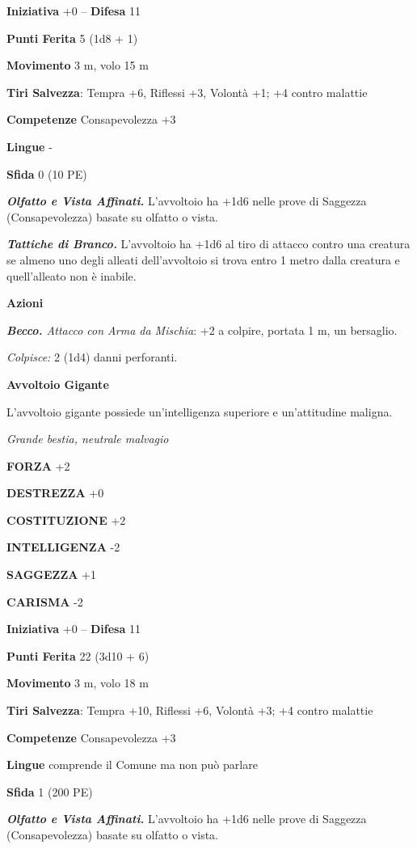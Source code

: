 \begin{multicols}{2}
\textbf{Iniziativa} +0 -- \textbf{Difesa} 11

\textbf{Punti Ferita} 5 (1d8 + 1)

\textbf{Movimento} 3 m, volo 15 m

\textbf{Tiri Salvezza}: Tempra +6, Riflessi +3, Volontà +1; +4 contro malattie

\textbf{Competenze} Consapevolezza +3

\textbf{Lingue} -

\textbf{Sfida} 0 (10 PE)

\emph{\textbf{Olfatto e Vista Affinati.}} L'avvoltoio ha +1d6 nelle prove di Saggezza (Consapevolezza) basate su olfatto o vista.

\emph{\textbf{Tattiche di Branco.}} L'avvoltoio ha +1d6 al tiro di attacco contro una creatura se almeno uno degli alleati dell'avvoltoio si trova entro 1 metro dalla creatura e quell'alleato non è inabile.

\textbf{Azioni}

\emph{\textbf{Becco.} Attacco con Arma da Mischia}: +2 a colpire, portata 1 m, un bersaglio.

\emph{Colpisce:} 2 (1d4) danni perforanti.

\medskip\textbf{Avvoltoio Gigante}

L'avvoltoio gigante possiede un'intelligenza superiore e un'attitudine maligna.

\emph{Grande bestia, neutrale malvagio}

\textbf{FORZA} +2

\textbf{DESTREZZA} +0

\textbf{COSTITUZIONE} +2

\textbf{INTELLIGENZA} -2

\textbf{SAGGEZZA} +1

\textbf{CARISMA} -2

\textbf{Iniziativa} +0 -- \textbf{Difesa} 11

\textbf{Punti Ferita} 22 (3d10 + 6)

\textbf{Movimento} 3 m, volo 18 m

\textbf{Tiri Salvezza}: Tempra +10, Riflessi +6, Volontà +3; +4 contro malattie

\textbf{Competenze} Consapevolezza +3

\textbf{Lingue} comprende il Comune ma non può parlare

\textbf{Sfida} 1 (200 PE)

\emph{\textbf{Olfatto e Vista Affinati.}} L'avvoltoio ha +1d6 nelle prove di Saggezza (Consapevolezza) basate su olfatto o vista.


\end{multicols}
